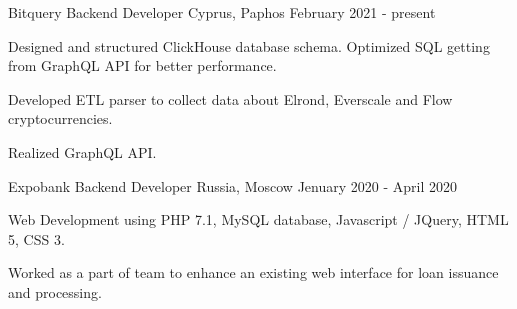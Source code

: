 

\begin{cventries}

  \cventry
    {Bitquery} %
    {Backend Developer} %
    {Cyprus, Paphos} %
    {February 2021 - present} %
    {
      \begin{cvitems} %
        \item {Designed and structured ClickHouse database schema. Optimized SQL getting from GraphQL API for better performance.}
        \item {Developed ETL parser to collect data about Elrond, Everscale and Flow cryptocurrencies.}
        \item {Realized GraphQL API.}
      \end{cvitems}
  }

  \cventry
    {Expobank} %
    {Backend Developer} %
    {Russia, Moscow} %
    {Jenuary 2020 - April 2020} %
    {
      \begin{cvitems} %
        \item {Web Development using PHP 7.1, MySQL database, Javascript / JQuery, HTML 5, CSS 3.}
        \item {Worked as a part of team to enhance an existing web interface for loan issuance and processing.}
      \end{cvitems}
  }

\end{cventries}
